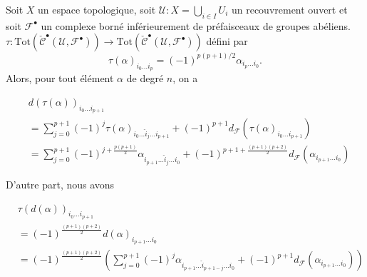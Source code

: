 \noindent

Soit $X$ un espace topologique, soit $\mathcal{U} : X = \bigcup_{i \in I} U_i$
un recouvrement ouvert et soit $\mathcal{F}^\bullet$ un complexe borné inférieurement de préfaisceaux de groupes abéliens.
$\tau :
\text{Tot}(\check{\mathcal{C}}^\bullet({\mathcal U}, {\mathcal F}^\bullet))
\to
\text{Tot}(\check{\mathcal{C}}^\bullet({\mathcal U}, {\mathcal F}^\bullet))$
défini par
$$
\tau(\alpha)_{i_0 \ldots i_p} = (-1)^{p(p + 1)/2} \alpha_{i_p \ldots i_0}.
$$
Alors, pour tout élément $\alpha$ de degré $n$, on a

\begin{align*}
& d(\tau(\alpha))_{i_0 \ldots i_{p + 1}} \\
& =
\sum\nolimits_{j = 0}^{p + 1}
(-1)^j
\tau(\alpha)_{i_0 \ldots \hat i_j \ldots i_{p + 1}}
+
(-1)^{p + 1}
d_{\mathcal F}(\tau(\alpha)_{i_0 \ldots i_{p + 1}})
\\
& =
\sum\nolimits_{j = 0}^{p + 1}
(-1)^{j + \frac{p(p + 1)}{2}}
\alpha_{i_{p + 1} \ldots \hat i_j \ldots i_0}
+
(-1)^{p + 1 + \frac{(p + 1)(p + 2)}{2}}
d_{\mathcal F}(\alpha_{i_{p + 1} \ldots i_0})
\end{align*}

D'autre part, nous avons

\begin{align*}
& \tau(d(\alpha))_{i_0\ldots i_{p + 1}} \\
& =
(-1)^{\frac{(p + 1)(p + 2)}{2}} d(\alpha)_{i_{p + 1} \ldots i_0}
\\
& =
(-1)^{\frac{(p + 1)(p + 2)}{2}}
\left(
\sum\nolimits_{j = 0}^{p + 1}
(-1)^j
\alpha_{i_{p + 1}\ldots \hat i_{p + 1 - j} \ldots i_0}
+
(-1)^{p + 1}
d_{\mathcal F}(\alpha_{i_{p + 1}\ldots i_0})
\right)
\end{align*}

